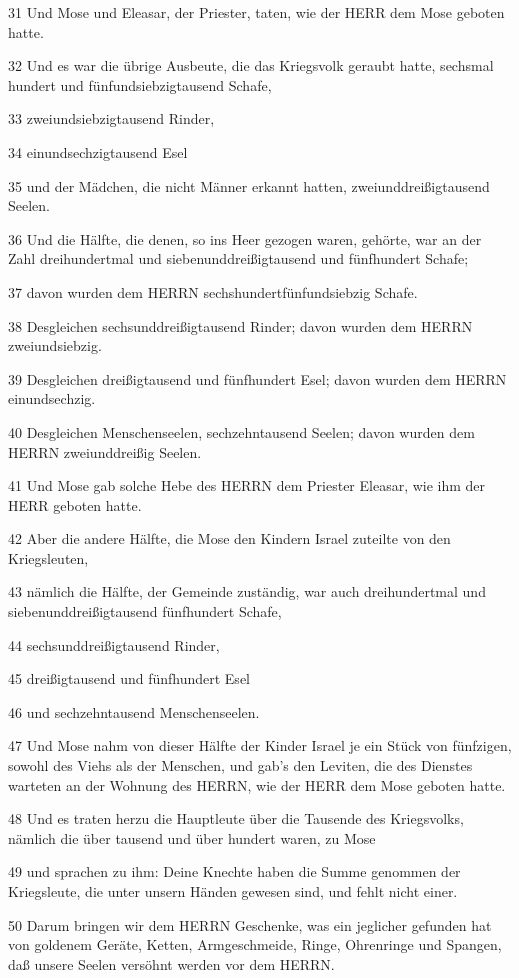 \par 31 Und Mose und Eleasar, der Priester, taten, wie der HERR dem Mose geboten hatte.
\par 32 Und es war die übrige Ausbeute, die das Kriegsvolk geraubt hatte, sechsmal hundert und fünfundsiebzigtausend Schafe,
\par 33 zweiundsiebzigtausend Rinder,
\par 34 einundsechzigtausend Esel
\par 35 und der Mädchen, die nicht Männer erkannt hatten, zweiunddreißigtausend Seelen.
\par 36 Und die Hälfte, die denen, so ins Heer gezogen waren, gehörte, war an der Zahl dreihundertmal und siebenunddreißigtausend und fünfhundert Schafe;
\par 37 davon wurden dem HERRN sechshundertfünfundsiebzig Schafe.
\par 38 Desgleichen sechsunddreißigtausend Rinder; davon wurden dem HERRN zweiundsiebzig.
\par 39 Desgleichen dreißigtausend und fünfhundert Esel; davon wurden dem HERRN einundsechzig.
\par 40 Desgleichen Menschenseelen, sechzehntausend Seelen; davon wurden dem HERRN zweiunddreißig Seelen.
\par 41 Und Mose gab solche Hebe des HERRN dem Priester Eleasar, wie ihm der HERR geboten hatte.
\par 42 Aber die andere Hälfte, die Mose den Kindern Israel zuteilte von den Kriegsleuten,
\par 43 nämlich die Hälfte, der Gemeinde zuständig, war auch dreihundertmal und siebenunddreißigtausend fünfhundert Schafe,
\par 44 sechsunddreißigtausend Rinder,
\par 45 dreißigtausend und fünfhundert Esel
\par 46 und sechzehntausend Menschenseelen.
\par 47 Und Mose nahm von dieser Hälfte der Kinder Israel je ein Stück von fünfzigen, sowohl des Viehs als der Menschen, und gab's den Leviten, die des Dienstes warteten an der Wohnung des HERRN, wie der HERR dem Mose geboten hatte.
\par 48 Und es traten herzu die Hauptleute über die Tausende des Kriegsvolks, nämlich die über tausend und über hundert waren, zu Mose
\par 49 und sprachen zu ihm: Deine Knechte haben die Summe genommen der Kriegsleute, die unter unsern Händen gewesen sind, und fehlt nicht einer.
\par 50 Darum bringen wir dem HERRN Geschenke, was ein jeglicher gefunden hat von goldenem Geräte, Ketten, Armgeschmeide, Ringe, Ohrenringe und Spangen, daß unsere Seelen versöhnt werden vor dem HERRN.
